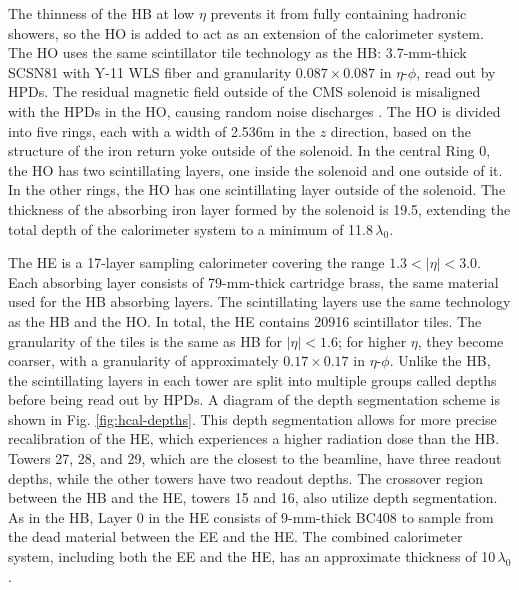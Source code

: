 \documentclass[12pt]{thesis}  %
\begin{document}
The thinness of the HB at low $\eta$ prevents it from fully containing hadronic showers, so the HO is added to act as an extension of the calorimeter system. The HO uses the same scintillator tile technology as the HB: 3.7-mm-thick SCSN81 with Y-11 WLS fiber and granularity $0.087\times0.087$ in $\eta$-$\phi$, read out by HPDs. The residual magnetic field outside of the CMS solenoid is misaligned with the HPDs in the HO, causing random noise discharges \cite{HcalPerf,FreemanSipm}. The HO is divided into five rings, each with a width of 2.536\unit{m} in the $z$ direction, based on the structure of the iron return yoke outside of the solenoid. In the central Ring 0, the HO has two scintillating layers, one inside the solenoid and one outside of it. In the other rings, the HO has one scintillating layer outside of the solenoid. The thickness of the absorbing iron layer formed by the solenoid is 19.5\cm, extending the total depth of the calorimeter system to a minimum of 11.8$\,\lambda_{0}$.

The HE is a 17-layer sampling calorimeter covering the range $1.3<|\eta|<3.0$. Each absorbing layer consists of 79-mm-thick cartridge brass, the same material used for the HB absorbing layers. The scintillating layers use the same technology as the HB and the HO. In total, the HE contains 20916 scintillator tiles. The granularity of the tiles is the same as HB for $|\eta|<1.6$; for higher $\eta$, they become coarser, with a granularity of approximately $0.17\times0.17$ in $\eta$-$\phi$. Unlike the HB, the scintillating layers in each tower are split into multiple groups called depths before being read out by HPDs. A diagram of the depth segmentation scheme is shown in Fig. \ref{fig:hcal-depths}. This depth segmentation allows for more precise recalibration of the HE, which experiences a higher radiation dose than the HB. Towers 27, 28, and 29, which are the closest to the beamline, have three readout depths, while the other towers have two readout depths. The crossover region between the HB and the HE, towers 15 and 16, also utilize depth segmentation. As in the HB, Layer 0 in the HE consists of 9-mm-thick BC408 to sample from the dead material between the EE and the HE. The combined calorimeter system, including both the EE and the HE, has an approximate thickness of 10$\,\lambda_{0}$.
\end{document}
